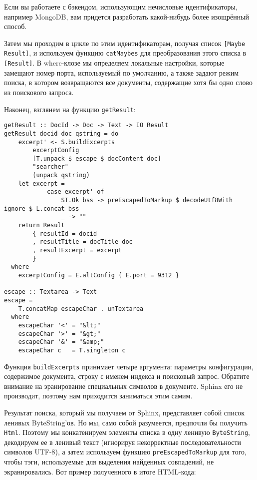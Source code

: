 \begin{remark}
  Если вы работаете с бэкендом, использующим нечисловые идентификаторы, например MongoDB, вам придется разработать какой-нибудь более изощрённый способ.
\end{remark}

Затем мы проходим в цикле по этим идентификаторам, получая список \lstinline'[Maybe Result]', и используем функцию \lstinline'catMaybes' для преобразования этого списка в \lstinline'[Result]'. В where-клозе мы определяем локальные настройки, которые замещают номер порта, используемый по умолчанию, а также задают режим поиска, в котором возвращаются все документы, содержащие хотя бы одно слово из поискового запроса. %

Наконец, взглянем на функцию \lstinline'getResult':

\begin{lstlisting}
getResult :: DocId -> Doc -> Text -> IO Result
getResult docid doc qstring = do
    excerpt' <- S.buildExcerpts
        excerptConfig
        [T.unpack $ escape $ docContent doc]
        "searcher"
        (unpack qstring)
    let excerpt =
            case excerpt' of
                ST.Ok bss -> preEscapedToMarkup $ decodeUtf8With ignore $ L.concat bss
                _ -> ""
    return Result
        { resultId = docid
        , resultTitle = docTitle doc
        , resultExcerpt = excerpt
        }
  where
    excerptConfig = E.altConfig { E.port = 9312 }

escape :: Textarea -> Text
escape =
    T.concatMap escapeChar . unTextarea
  where
    escapeChar '<' = "&lt;"
    escapeChar '>' = "&gt;"
    escapeChar '&' = "&amp;"
    escapeChar c   = T.singleton c
\end{lstlisting}

Функция \lstinline'buildExcerpts' принимает четыре аргумента: параметры конфигурации, содержимое документа, строку с именем индекса и поисковый запрос. Обратите внимание на эранирование специальных символов в документе. Sphinx его не производит, поэтому нам приходится заниматься этим самим.

Результат поиска, который мы получаем от Sphinx, представляет собой список ленивых ByteString'ов. Но мы, само собой разумеется, предпочли бы получить \lstinline'Html'. Поэтому мы конкатенируем элементы списка в одну ленивую \lstinline'ByteString', декодируем ее в ленивый текст (игнорируя некорректные последовательности символов UTF-8), а затем используем функцию \lstinline'preEscapedToMarkup' для того, чтобы тэги, используемые для выделения найденных совпадений, не экранировались. Вот пример полученного в итоге HTML-кода:

